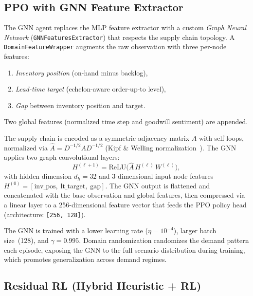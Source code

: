 \subsection{PPO with GNN Feature Extractor}\label{sec:ppo_gnn}

The GNN agent replaces the MLP feature extractor with a custom
\emph{Graph Neural Network} (\texttt{GNNFeaturesExtractor}) that
respects the supply chain topology. A
\texttt{DomainFeatureWrapper} augments the raw observation with
three per-node features:
\begin{enumerate}
  \item \emph{Inventory position} (on-hand minus backlog),
  \item \emph{Lead-time target} (echelon-aware order-up-to level),
  \item \emph{Gap} between inventory position and target.
\end{enumerate}
Two global features (normalized time step and goodwill sentiment)
are appended.

The supply chain is encoded as a symmetric adjacency matrix $A$ with
self-loops, normalized via $\hat{A} = D^{-1/2} A D^{-1/2}$
(Kipf \& Welling normalization~\citep{kipf2017semi}). The GNN applies
two graph convolutional layers:
\begin{equation}\label{eq:gnn}
  H^{(\ell+1)} = \text{ReLU}\bigl(\hat{A} \, H^{(\ell)} \, W^{(\ell)}\bigr),
\end{equation}
with hidden dimension $d_h = 32$ and 3-dimensional input node features
$H^{(0)} = [\text{inv\_pos},\; \text{lt\_target},\; \text{gap}]$.
The GNN output is flattened and concatenated with the base observation
and global features, then compressed via a linear layer to a
256-dimensional feature vector that feeds the PPO policy head
(architecture: \texttt{[256, 128]}).

The GNN is trained with a lower learning rate ($\eta = 10^{-4}$),
larger batch size~(128), and $\gamma = 0.995$. Domain randomization
randomizes the demand pattern each episode, exposing the GNN to the
full scenario distribution during training, which promotes
generalization across demand regimes.

\subsection{Residual RL (Hybrid Heuristic + RL)}\label{sec:residual}

